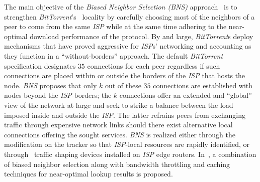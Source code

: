 The main objective of the \emph{Biased Neighbor Selection (BNS)} 
approach~\cite{BCCMSBZ2006} is to 
strengthen {\sl BitTorrent}'s~\cite{c_bittorrent_2003} locality 
by carefully choosing most of the neighbors of a peer to come from 
the same \emph{ISP} while at the same time adhering to the near-optimal
download performance of the protocol.
By and large, {\sl BitTorrent}s deploy mechanisms that have proved 
aggressive for \emph{ISP}s' networking and accounting as they function 
in a ``without-borders'' approach.
The default {\sl BitTorrent} specification designates $35$ connections 
for each peer regardless if such connections are placed within or outside 
the borders of the \emph{ISP} that hosts the node.
\emph{BNS} proposes that only $k$ out of these $35$ connections are 
established with nodes beyond the {\it ISP}-borders;
the $k$ connections offer an extended and ``global'' view of 
the network at large and seek to strike a balance between 
the load imposed inside and outside the \emph{ISP}.
The latter refrains peers from exchanging traffic through
expensive network links should there exist alternative local connections
offering the sought services.
\emph{BNS} is realized either through 
the modification on the tracker so that \emph{ISP}-local resources are rapidly 
identified,
or through \p\ traffic shaping devices installed on \emph{ISP} edge routers. 
In~\cite{BCCMSBZ2006}, a combination of 
biased neighbor selection along with bandwidth throttling
and caching techniques for near-optimal lookup results is proposed.
